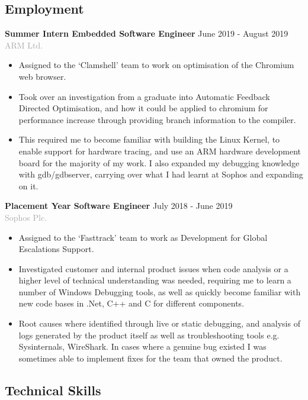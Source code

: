 \documentclass[11pt]{article}
\newcommand{\dash}{\item[-]}
\newcommand{\linesep}{\noindent\makebox[\linewidth]{\rule{\linewidth}{0.2pt}}}
\begin{document}
 \subsection*{Employment}
\textbf{Summer Intern Embedded Software Engineer} \hfill June 2019 - August 2019 \\
\textcolor{darkgray}{ARM Ltd.}
  \begin{itemize}
   \dash Assigned to the ‘Clamshell’ team to work on optimisation of the Chromium web browser.
   \dash Took over an investigation from a graduate into Automatic Feedback Directed Optimisation, and how it could be applied to chromium for performance increase through providing branch information to the compiler.
   \dash This required me to become familiar with building the Linux Kernel, to enable support for hardware tracing, and use an ARM hardware development board for the majority of my work. I also expanded my debugging knowledge with gdb/gdbserver, carrying over what I had learnt at Sophos and expanding on it.
  \end{itemize}
\vspace{10pt}
\textbf{Placement Year Software Engineer} \hfill July 2018 - June 2019 \\
\textcolor{darkgray}{Sophos Plc.}
  \begin{itemize}
   \dash Assigned to the ‘Fasttrack’ team to work as Development for Global Escalations Support.
   \dash Investigated customer and internal product issues when code analysis or a higher level of technical understanding was needed, requiring me to learn a number of Windows Debugging tools, as well as quickly become familiar with new code bases in .Net, C++ and C for different components.
   \dash Root causes where identified through live or static debugging, and analysis of logs generated by the product itself as well as troubleshooting tools e.g. Sysinternals, WireShark. In cases where a genuine bug existed I was sometimes able to implement fixes for the team that owned the product.
  \end{itemize}

  \linesep

  \subsection*{Technical Skills}
   \renewcommand\tabularxcolumn[1]{b{#1}}%
\end{document}
